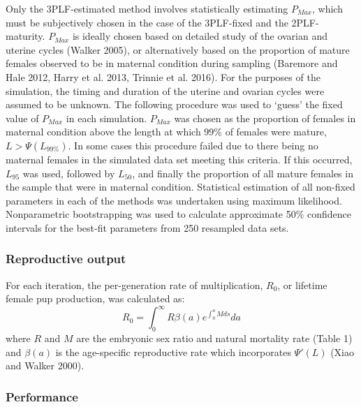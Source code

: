 \documentclass[
]{article}
\begin{document}
Only the 3PLF-estimated method involves statistically estimating \(P_{Max}\), which must be subjectively chosen in the case of the 3PLF-fixed and the 2PLF-maturity. \(P_{Max}\) is ideally chosen based on detailed study of the ovarian and uterine cycles (Walker 2005), or alternatively based on the proportion of mature females observed to be in maternal condition during sampling (Baremore and Hale 2012, Harry et al. 2013, Trinnie et al. 2016). For the purposes of the simulation, the timing and duration of the uterine and ovarian cycles were assumed to be unknown. The following procedure was used to `guess' the fixed value of \(P_{Max}\) in each simulation. \(P_{Max}\) was chosen as the proportion of females in maternal condition above the length at which \(99\%\) of females were mature, \(L > \Psi(L_{99\%})\). In some cases this procedure failed due to there being no maternal females in the simulated data set meeting this criteria. If this occurred, \(L_{95}\) was used, followed by \(L_{50}\), and finally the proportion of all mature females in the sample that were in maternal condition. Statistical estimation of all non-fixed parameters in each of the methods was undertaken using maximum likelihood. Nonparametric bootstrapping was used to calculate approximate 50\% confidence intervals for the best-fit parameters from 250 resampled data sets.

\subsubsection{Reproductive output}\label{reproductive-output}

For each iteration, the per-generation rate of multiplication, \(R_0\), or lifetime female pup production, was calculated as: \[R_0 =\int_{0}^{\infty}R\beta(a)e^{\int_{0}^{a}M ds}da \] where \(R\) and \(M\) are the embryonic sex ratio and natural mortality rate (Table 1) and \(\beta(a)\) is the age-specific reproductive rate which incorporates \(\Psi'(L)\) (Xiao and Walker 2000).

\subsubsection{Performance}\label{performance}
\end{document}
